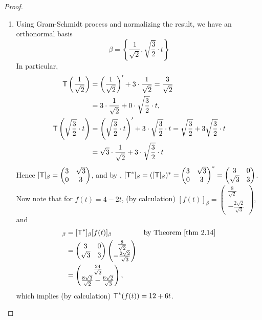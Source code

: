 \begin{proof}
\begin{enumerate}
\item Using Gram-Schmidt process and normalizing the result, we have an orthonormal basis
\[
    \beta = \left\{ \frac{1}{\sqrt{2}}, \sqrt{\frac{3}{2}} \cdot t \right\}
\]
In particular,
\begin{align*}
    \textsf{T} \left( \frac{1}{\sqrt{2}} \right)
        & = \left(\frac{1}{\sqrt{2}}\right)' + 3 \cdot \frac{1}{\sqrt{2}} = \frac{3}{\sqrt{2}} \\
        & = 3 \cdot \frac{1}{\sqrt{2}} + 0 \cdot \sqrt{\frac{3}{2}} \cdot t, \\
    \textsf{T} \left( \sqrt{\frac{3}{2}} \cdot t \right)
        & = \left(\sqrt{\frac{3}{2}} \cdot t \right)' + 3 \cdot \sqrt{\frac{3}{2}} \cdot t = \sqrt{\frac{3}{2}} + 3\sqrt{\frac{3}{2}} \cdot t \\
        & = \sqrt{3} \cdot \frac{1}{\sqrt{2}} + 3 \cdot \sqrt{\frac{3}{2}} \cdot t
\end{align*}
Hence \([\textsf{T}]_{\beta} = \begin{pmatrix} 3 & \sqrt{3} \\ 0 & 3 \end{pmatrix}\), and by , \([\textsf{T}^*]_{\beta} = ([\textsf{T}]_{\beta})^* = \begin{pmatrix} 3 & \sqrt{3} \\ 0 & 3 \end{pmatrix}^* = \begin{pmatrix} 3 & 0 \\ \sqrt{3} & 3 \end{pmatrix}\).
Now note that for \(f(t) = 4 - 2t\), (by calculation) \([f(t)]_{\beta} = \begin{pmatrix} \frac{8}{\sqrt{2}} \\ -\frac{2\sqrt{2}}{\sqrt{3}} \end{pmatrix}\), and
\begin{align*}
    [\T^*(f(t))]_{\beta} & = [\T^*]_{\beta} [f(t)]_{\beta} & \text{by \THM{2.14}} \\
        & = \begin{pmatrix} 3 & 0 \\ \sqrt{3} & 3 \end{pmatrix} \begin{pmatrix} \frac{8}{\sqrt{2}} \\ -\frac{2\sqrt{2}}{\sqrt{3}} \end{pmatrix} \\
        & = \begin{pmatrix} \frac{24}{\sqrt{2}} \\ \frac{8\sqrt{3}}{\sqrt{2}} - \frac{6\sqrt{2}}{\sqrt{3}} \end{pmatrix},
\end{align*}
which implies (by calculation) \(\textsf{T}^*(f(t)) = 12 + 6t\).
\end{enumerate}
\end{proof}


